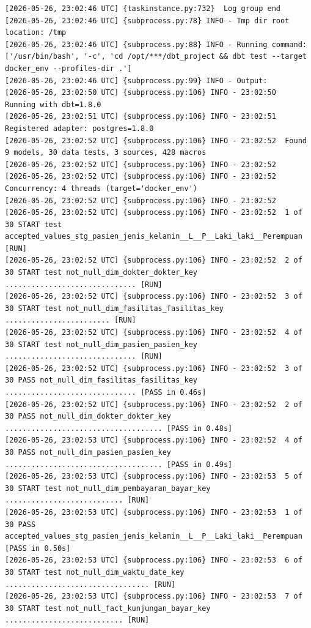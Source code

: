 \begin{lstlisting}[language={}, caption=Output Terminal dbt test pada Airflow Log]
[2026-05-26, 23:02:46 UTC] {taskinstance.py:732}  Log group end
[2026-05-26, 23:02:46 UTC] {subprocess.py:78} INFO - Tmp dir root location: /tmp
[2026-05-26, 23:02:46 UTC] {subprocess.py:88} INFO - Running command: ['/usr/bin/bash', '-c', 'cd /opt/***/dbt_project && dbt test --target docker_env --profiles-dir .']
[2026-05-26, 23:02:46 UTC] {subprocess.py:99} INFO - Output:
[2026-05-26, 23:02:50 UTC] {subprocess.py:106} INFO - 23:02:50  Running with dbt=1.8.0
[2026-05-26, 23:02:51 UTC] {subprocess.py:106} INFO - 23:02:51  Registered adapter: postgres=1.8.0
[2026-05-26, 23:02:52 UTC] {subprocess.py:106} INFO - 23:02:52  Found 9 models, 30 data tests, 3 sources, 428 macros
[2026-05-26, 23:02:52 UTC] {subprocess.py:106} INFO - 23:02:52
[2026-05-26, 23:02:52 UTC] {subprocess.py:106} INFO - 23:02:52  Concurrency: 4 threads (target='docker_env')
[2026-05-26, 23:02:52 UTC] {subprocess.py:106} INFO - 23:02:52
[2026-05-26, 23:02:52 UTC] {subprocess.py:106} INFO - 23:02:52  1 of 30 START test accepted_values_stg_pasien_jenis_kelamin__L__P__Laki_laki__Perempuan  [RUN]
[2026-05-26, 23:02:52 UTC] {subprocess.py:106} INFO - 23:02:52  2 of 30 START test not_null_dim_dokter_dokter_key .............................. [RUN]
[2026-05-26, 23:02:52 UTC] {subprocess.py:106} INFO - 23:02:52  3 of 30 START test not_null_dim_fasilitas_fasilitas_key ........................ [RUN]
[2026-05-26, 23:02:52 UTC] {subprocess.py:106} INFO - 23:02:52  4 of 30 START test not_null_dim_pasien_pasien_key .............................. [RUN]
[2026-05-26, 23:02:52 UTC] {subprocess.py:106} INFO - 23:02:52  3 of 30 PASS not_null_dim_fasilitas_fasilitas_key .............................. [PASS in 0.46s]
[2026-05-26, 23:02:52 UTC] {subprocess.py:106} INFO - 23:02:52  2 of 30 PASS not_null_dim_dokter_dokter_key .................................... [PASS in 0.48s]
[2026-05-26, 23:02:53 UTC] {subprocess.py:106} INFO - 23:02:52  4 of 30 PASS not_null_dim_pasien_pasien_key .................................... [PASS in 0.49s]
[2026-05-26, 23:02:53 UTC] {subprocess.py:106} INFO - 23:02:53  5 of 30 START test not_null_dim_pembayaran_bayar_key ........................... [RUN]
[2026-05-26, 23:02:53 UTC] {subprocess.py:106} INFO - 23:02:53  1 of 30 PASS accepted_values_stg_pasien_jenis_kelamin__L__P__Laki_laki__Perempuan  [PASS in 0.50s]
[2026-05-26, 23:02:53 UTC] {subprocess.py:106} INFO - 23:02:53  6 of 30 START test not_null_dim_waktu_date_key ................................. [RUN]
[2026-05-26, 23:02:53 UTC] {subprocess.py:106} INFO - 23:02:53  7 of 30 START test not_null_fact_kunjungan_bayar_key ........................... [RUN]

\end{lstlisting}
